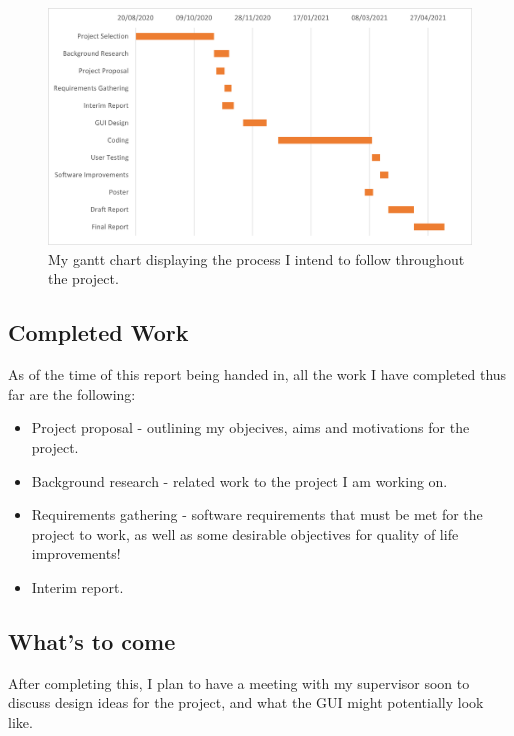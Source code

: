 \documentclass[a4paper, 12pt]{article}
\begin{document}
        \begin{figure}[h]
            \centering
            \includegraphics[width=150mm]{gantt_chart.png}
            \caption{My gantt chart displaying the process I intend to follow throughout
            the project.}
        \end{figure}

        \subsection{Completed Work}
            As of the time of this report being handed in, all the work I have completed thus
            far are the following:

            \begin{itemize}
                \item Project proposal - outlining my objecives, aims and motivations for the
                project.
                \item Background research - related work to the project I am working on.
                \item Requirements gathering - software requirements that must be met for
                the project to work, as well as some desirable objectives for quality of
                life improvements!
                \item Interim report.
            \end{itemize}

        \subsection{What's to come}
            After completing this, I plan to have a meeting with my supervisor soon to discuss
            design ideas for the project, and what the GUI might potentially look like.
\end{document}
